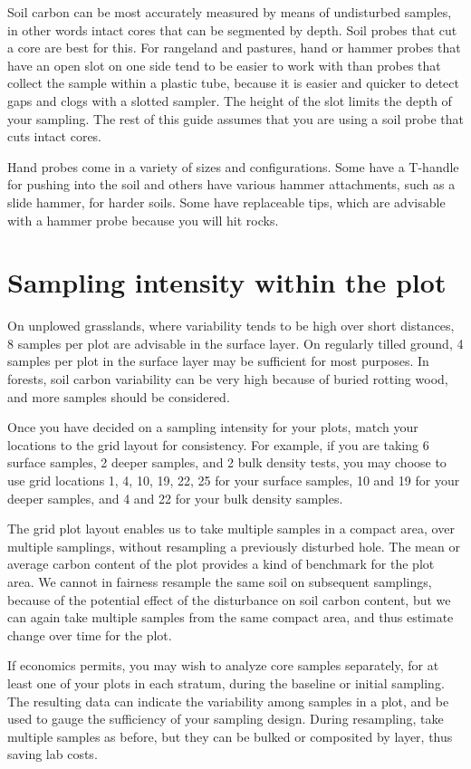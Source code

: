 \documentclass[11pt,letterpaper,oneside,onecolumn]{memoir}
\begin{document}
Soil carbon can be most accurately measured by means of undisturbed samples, in other words intact cores that can be segmented by depth. Soil probes that cut a core are best for this. For rangeland and pastures, hand or hammer probes that have an open slot on one side tend to be easier to work with than probes that collect the sample within a plastic tube, because it is easier and quicker to detect gaps and clogs with a slotted sampler. The height of the slot limits the depth of your sampling. The rest of this guide assumes that you are using a soil probe that cuts intact cores.

Hand probes come in a variety of sizes and configurations. Some have a T-handle for pushing into the soil and others have various hammer attachments, such as a slide hammer, for harder soils. Some have replaceable tips, which are advisable with a hammer probe because you will hit rocks.

\section{Sampling intensity within the plot}

On unplowed grasslands, where variability tends to be high over short distances, 8 samples per plot are advisable in the surface layer. On regularly tilled ground, 4 samples per plot in the surface layer may be sufficient for most purposes. In forests, soil carbon variability can be very high because of buried rotting wood, and more samples should be considered.

Once you have decided on a sampling intensity for your plots, match your locations to the grid layout for consistency. For example, if you are taking 6 surface samples, 2 deeper samples, and 2 bulk density tests, you may choose to use grid locations 1, 4, 10, 19, 22, 25 for your surface samples, 10 and 19 for your deeper samples, and 4 and 22 for your bulk density samples.

The grid plot layout enables us to take multiple samples in a compact area, over multiple samplings, without resampling a previously disturbed hole. The mean or average carbon content of the plot provides a kind of benchmark for the plot area. We cannot in fairness resample the same soil on subsequent samplings, because of the potential effect of the disturbance on soil carbon content, but we can again take multiple samples from the same compact area, and thus estimate change over time for the plot.

If economics permits, you may wish to analyze core samples separately, for at least one of your plots in each stratum, during the baseline or initial sampling. The resulting data can indicate the variability among samples in a plot, and be used to gauge the sufficiency of your sampling design. During resampling, take multiple samples as before, but they can be bulked or composited by layer, thus saving lab costs.
\end{document}

